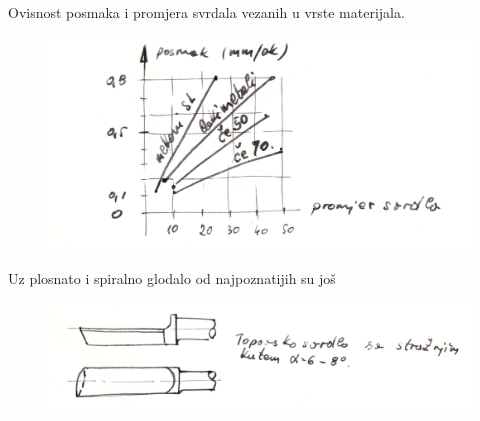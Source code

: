\documentclass[a4paper,12pt]{article}
\numberwithin{figure}{section}
\begin{document}
Ovisnost posmaka i promjera svrdala vezanih u vrste materijala.
\begin{figure}[!h]
\centering
\includegraphics[scale=0.13]{image_24-1.png}
\end{figure}
\FloatBarrier
Uz plosnato i spiralno glodalo od najpoznatijih su još
\begin{figure}[!h]
\centering
\includegraphics[scale=0.13]{image_24-2.png}
\end{figure}
\FloatBarrier
\end{document}
